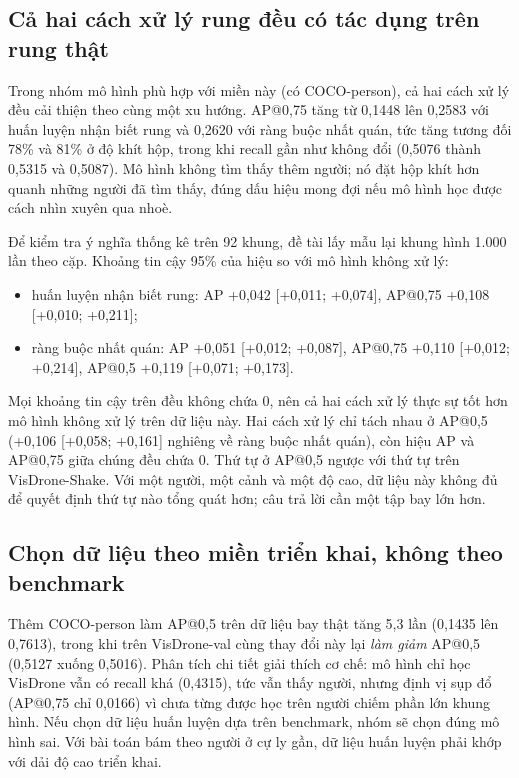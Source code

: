 \subsection{Cả hai cách xử lý rung đều có tác dụng trên rung thật}

Trong nhóm mô hình phù hợp với miền này (có COCO-person), cả hai cách xử lý đều cải thiện theo cùng một xu hướng. AP@0,75 tăng từ 0,1448 lên 0,2583 với huấn luyện nhận biết rung và 0,2620 với ràng buộc nhất quán, tức tăng tương đối 78\% và 81\% ở độ khít hộp, trong khi recall gần như không đổi (0,5076 thành 0,5315 và 0,5087). Mô hình không tìm thấy thêm người; nó đặt hộp khít hơn quanh những người đã tìm thấy, đúng dấu hiệu mong đợi nếu mô hình học được cách nhìn xuyên qua nhoè.

Để kiểm tra ý nghĩa thống kê trên 92 khung, đề tài lấy mẫu lại khung hình 1.000 lần theo cặp. Khoảng tin cậy 95\% của hiệu so với mô hình không xử lý:
\begin{itemize}
\item huấn luyện nhận biết rung: AP +0,042 [+0,011; +0,074], AP@0,75 +0,108 [+0,010; +0,211];
\item ràng buộc nhất quán: AP +0,051 [+0,012; +0,087], AP@0,75 +0,110 [+0,012; +0,214], AP@0,5 +0,119 [+0,071; +0,173].
\end{itemize}
Mọi khoảng tin cậy trên đều không chứa 0, nên cả hai cách xử lý thực sự tốt hơn mô hình không xử lý trên dữ liệu này. Hai cách xử lý chỉ tách nhau ở AP@0,5 (+0,106 [+0,058; +0,161] nghiêng về ràng buộc nhất quán), còn hiệu AP và AP@0,75 giữa chúng đều chứa 0. Thứ tự ở AP@0,5 ngược với thứ tự trên VisDrone-Shake. Với một người, một cảnh và một độ cao, dữ liệu này không đủ để quyết định thứ tự nào tổng quát hơn; câu trả lời cần một tập bay lớn hơn.

\subsection{Chọn dữ liệu theo miền triển khai, không theo benchmark}

Thêm COCO-person làm AP@0,5 trên dữ liệu bay thật tăng 5,3 lần (0,1435 lên 0,7613), trong khi trên VisDrone-val cùng thay đổi này lại \textit{làm giảm} AP@0,5 (0,5127 xuống 0,5016). Phân tích chi tiết giải thích cơ chế: mô hình chỉ học VisDrone vẫn có recall khá (0,4315), tức vẫn thấy người, nhưng định vị sụp đổ (AP@0,75 chỉ 0,0166) vì chưa từng được học trên người chiếm phần lớn khung hình. Nếu chọn dữ liệu huấn luyện dựa trên benchmark, nhóm sẽ chọn đúng mô hình sai. Với bài toán bám theo người ở cự ly gần, dữ liệu huấn luyện phải khớp với dải độ cao triển khai.

